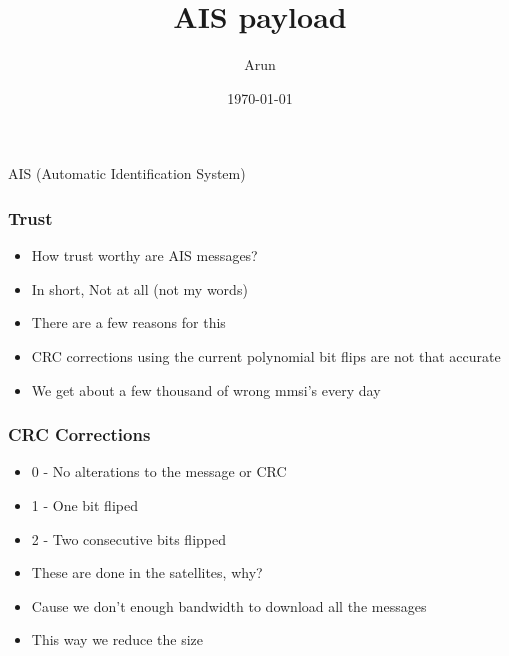 \documentclass[12pt]{beamer}
\title{AIS payload}
\author{Arun}
\date{\today}
\begin{document}
    \frame{\titlepage}
    \begin{frame}
        \begin{center}
            AIS (Automatic Identification System)
        \end{center}
    \end{frame}

    \begin{frame}
        \frametitle{Trust}
            \begin{itemize}
                \item How trust worthy are AIS messages?
                \pause
                \item In short, Not at all (not my words)
                \pause
                \item There are a few reasons for this
                \pause
                \item CRC corrections using the current polynomial bit flips are not that accurate
                \pause
                \item We get about a few thousand of wrong mmsi's every day
            \end{itemize}
    \end{frame}

    \begin{frame}
        \frametitle{CRC Corrections}
            \begin{itemize}
                \item 0 - No alterations to the message or CRC
                \pause
                \item 1 - One bit fliped
                \pause
                \item 2 - Two consecutive bits flipped
                \pause
                \item These are done in the satellites, why?
                \pause
                \item Cause we don't enough bandwidth to download all the messages
                \pause
                \item This way we reduce the size
            \end{itemize}
    \end{frame}
\end{document}

